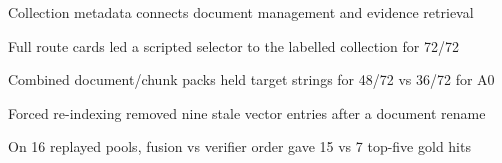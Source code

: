 \begin{highlights}
\item Collection metadata connects document management and evidence retrieval
\item Full route cards led a scripted selector to the labelled collection for 72/72
\item Combined document/chunk packs held target strings for 48/72 vs 36/72 for A0
\item Forced re-indexing removed nine stale vector entries after a document rename
\item On 16 replayed pools, fusion vs verifier order gave 15 vs 7 top-five gold hits
\end{highlights}
